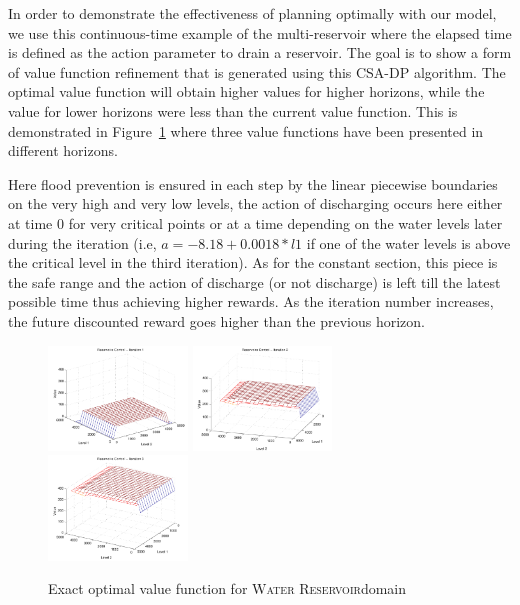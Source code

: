 \documentclass[letterpaper]{article}
\newcommand{\WaterReservoir}{\textsc{Water Reservoir}}
\begin{document}
In order to demonstrate the effectiveness of planning optimally with our model, we use this continuous-time example of the multi-reservoir where the elapsed time is defined as the action parameter to drain a reservoir. The goal is to show a form of value function refinement that is generated using this CSA-DP algorithm. The optimal value function will obtain higher values for higher horizons, while the value for lower horizons were less than the current value function. This is demonstrated in Figure~\ref{fig:reservoir} where three value functions have been presented in different horizons. 

Here flood prevention is ensured in each step by the linear piecewise boundaries on the very high and very low levels, the action of discharging occurs here either at time 0 for very critical points or at a time depending on the water levels later during the iteration (i.e, $a = -8.18 + 0.0018*l1$ if one of the water levels is above the critical level in the third iteration). As for the constant section, this piece is the safe range and the action of discharge (or not discharge) is left till the latest possible time thus achieving higher rewards. As the iteration number increases, the future discounted reward goes higher than the previous horizon. 

\begin{figure}[t]
\centering
\includegraphics[width=0.33\textwidth]{Figures1/ref1.pdf}
\includegraphics[width=0.33\textwidth]{Figures1/ref3.pdf}
\includegraphics[width=0.33\textwidth]{Figures1/ref6.pdf}
\caption{%
Exact optimal value function for \WaterReservoir  domain
}
\label{fig:reservoir}
\end{figure}
\end{document}

